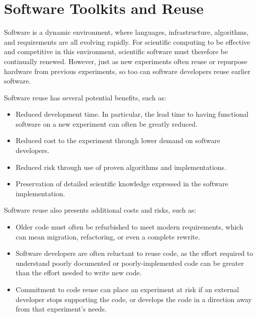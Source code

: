 

\section{Software Toolkits and Reuse}
\label{CpFI4:sec:reuse}

Software is a dynamic environment, where languages, infrastructure,
algorithms, and requirements are all evolving rapidly.
For scientific computing to be effective and competitive in this environment,
scientific software must therefore be continually renewed.
However, just as new experiments often reuse or repurpose hardware
from previous experiments, so too can software
developers reuse earlier software. 

 Software reuse has several potential benefits, such as:
\begin{itemize}
\item Reduced development time.  In particular, the lead time to having
functional software on a new experiment can often be greatly reduced.
\item Reduced cost to the experiment through lower demand on software developers.
\item Reduced risk through use of proven algorithms and implementations.
\item Preservation of detailed scientific knowledge expressed in the software implementation.
\end{itemize}
Software reuse also presents additional costs and risks, such as:
\begin{itemize}
\item Older code must often be refurbished to meet modern requirements,
which can mean migration, refactoring, or even a complete rewrite.
\item Software developers are often reluctant to reuse code,
as the effort required to understand poorly documented or
poorly-implemented code can be greater than the effort needed to write new code.
\item Commitment to code reuse can place an experiment at risk
if an external developer stops supporting the code, or develops the
code in a direction away from that experiment's needs.
\end{itemize}

